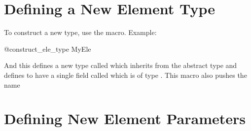 \section{Defining a New Element Type}
\label{s:ele.new.type}

To construct a new type, use the  macro. Example:
\begin{example}
  @construct_ele_type MyEle
\end{example}
And this defines a new type called  which inherits from the abstract type  and
defines  to have a single field called  which is of type .
This macro also pushes the name

\section{Defining New Element Parameters}
\label{s:ele.new.param}

